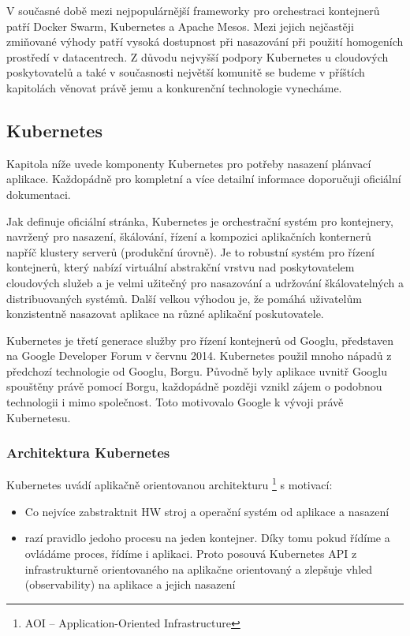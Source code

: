 \documentclass[thesis=M,czech]{FITthesis}[2019/12/23]
\theoremstyle{plain}
\theoremstyle{definition}
\begin{document}
V současné době mezi nejpopulárnější frameworky pro orchestraci kontejnerů patří Docker Swarm, Kubernetes a Apache Mesos. Mezi jejich nejčastěji zmiňované výhody patří vysoká dostupnost při nasazování při použití homogeních prostředí v datacentrech. Z důvodu nejvyšší podpory Kubernetes u cloudových poskytovatelů a také v současnosti největší komunitě se budeme v příštích kapitolách věnovat právě jemu a konkurenční technologie vynecháme.

\subsection{Kubernetes}

Kapitola níže uvede komponenty Kubernetes pro potřeby nasazení plánvací aplikace. Každopádně pro kompletní a více detailní informace doporučuji oficiální dokumentaci. 

Jak definuje oficiální stránka, Kubernetes je orchestrační systém pro kontejnery, navržený pro nasazení, škálování, řízení a kompozici aplikačních konternerů napříč klustery serverů (produkční úrovně). Je to robustní systém pro řízení  kontejnerů, který nabízí virtuální abstrakční vrstvu nad poskytovatelem cloudových služeb a je velmi užitečný pro nasazování a udržování škálovatelných a distribuovaných systémů. Další velkou výhodou je, že pomáhá uživatelům konzistentně nasazovat aplikace na různé aplikační poskutovatele.

Kubernetes je třetí generace služby pro řízení kontejnerů od Googlu, představen na Google Developer Forum v červnu 2014. Kubernetes použil mnoho nápadů z předchozí technologie od Googlu, Borgu. Původně byly aplikace uvnitř Googlu spouštěny právě pomocí Borgu, každopádně později vznikl zájem o podobnou technologii i mimo společnost. Toto motivovalo Google k vývoji právě Kubernetesu.  

\subsubsection{Architektura Kubernetes}


Kubernetes uvádí aplikačně orientovanou architekturu \footnote{AOI -- Application-Oriented Infrastructure}\cite{as-k8s-san-kho-lin}
s motivací:


\begin{itemize}  
\item  Co nejvíce zabstraktnit HW stroj a operační systém od aplikace a nasazení 
\item  razí pravidlo jedoho procesu na jeden kontejner. Díky tomu pokud řídíme a ovládáme proces, řídíme i aplikaci. Proto posouvá Kubernetes API z infrastrukturně orientovaného na aplikačne orientovaný a zlepšuje vhled (observability) na aplikace a jejich nasazení
\end{itemize}
\end{document}
